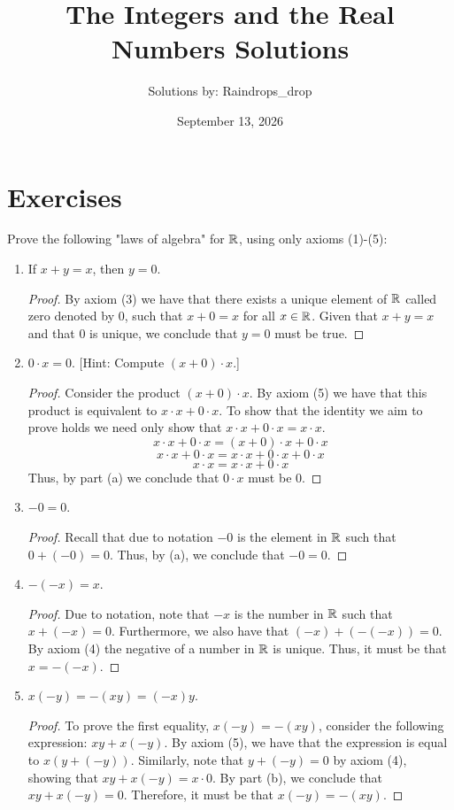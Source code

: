 \documentclass[12pt]{article}
\begin{document}
	\title{The Integers and the Real Numbers Solutions}
	\author{Solutions by: Raindrops\_drop}
	\date{September 13, 2026}
	\maketitle
	
	\section*{Exercises}
	
	 Prove the following "laws of algebra" for $\mathbb{R}$, using only axioms (1)-(5):
	\begin{enumerate}[label=(\alph*)]
		\item If $x + y = x$, then $y = 0$.
		\begin{proof}
			By axiom (3) we have that there exists a unique element of $\mathbb{R}$ called zero denoted by $0$,
			such that $x + 0 = x$ for all $x \in \mathbb{R}$. Given that $x + y = x$ and that $0$ is unique, 
			we conclude that $y = 0$ must be true.
		\end{proof}
		\item $0 \cdot x = 0$. [Hint: Compute $(x + 0) \cdot x$.]
		\begin{proof}
			Consider the product $(x + 0) \cdot x$. By axiom (5) we have that this product is equivalent
			to $x \cdot x + 0 \cdot x$. To show that the identity we aim to prove holds we need only show that 
			$x \cdot x + 0\cdot x = x \cdot x$.
			$$
			x \cdot x + 0 \cdot x = (x + 0) \cdot x + 0 \cdot x
			$$
			$$
			x \cdot x + 0 \cdot x = x \cdot x + 0 \cdot x + 0 \cdot x
			$$
			$$
			x \cdot x = x \cdot x + 0 \cdot x
			$$
			Thus, by part (a) we conclude that $0 \cdot x$ must be $0$.
		\end{proof}
		\item $-0 = 0$.
		\begin{proof}
			Recall that due to notation $-0$ is the element in $\mathbb{R}$ such that $0 + (-0) = 0$.
			Thus, by (a), we conclude that $-0 = 0$.
		\end{proof}
		\item $-(-x) = x$.
		\begin{proof}
			Due to notation, note that $-x$ is the number in $\mathbb{R}$ such that $x + (-x) = 0$.
			Furthermore, we also have that $(-x) + (-(-x)) = 0$. By axiom (4) the negative of a number
			in $\mathbb{R}$ is unique. Thus, it must be that $x = -(-x)$.
		\end{proof}
		\item $x(-y) = -(xy) = (-x)y$.
		\begin{proof}
			To prove the first equality, $x(-y) = -(xy)$, consider the following expression: $xy + x(-y)$.
			By axiom (5), we have that the expression is equal to $x(y + (-y))$. Similarly, note
			that $y + (-y) = 0$ by axiom (4), showing that $xy + x(-y) = x \cdot 0$. By part (b),
			we conclude that $xy + x(-y) = 0$. Therefore, it must be that $x(-y) = -(xy)$.
			

\end{proof}
\end{enumerate}
\end{document}
